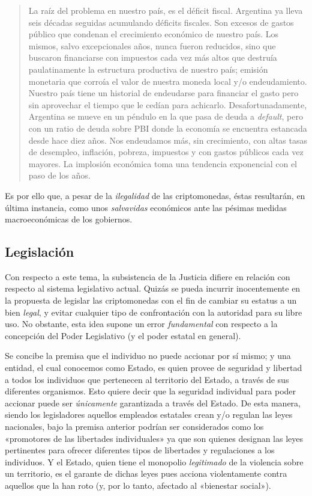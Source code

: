 \documentclass[12pt,a4paper,twoside]{book}
\begin{document}
\begin{quotation}
La raíz del problema en nuestro país, es el déficit fiscal. Argentina ya lleva seis décadas seguidas acumulando déficits fiscales. Son excesos de gastos público que condenan el crecimiento económico de nuestro país. Los mismos, salvo excepcionales años, nunca fueron reducidos, sino que buscaron financiarse con impuestos cada vez más altos que destruía paulatinamente la estructura productiva de nuestro país; emisión monetaria que corroía el valor de nuestra moneda local y/o endeudamiento. Nuestro país tiene un historial de endeudarse para financiar el gasto pero sin aprovechar el tiempo que le cedían para achicarlo. Desafortunadamente, Argentina se mueve en un péndulo en la que pasa de deuda a \textit{default}, pero con un ratio de deuda sobre PBI donde la economía se encuentra estancada desde hace diez años. Nos endeudamos más, sin crecimiento, con altas tasas de desempleo, inflación, pobreza, impuestos y con gastos públicos cada vez mayores. La implosión económica toma una tendencia exponencial con el paso de los años. \cite{motyl:deuda-argentina}
\end{quotation}		

Es por ello que, a pesar de la \textit{ilegalidad} de las criptomonedas, éstas resultarán, en última instancia, como unos \textit{salvavidas} económicos ante las pésimas medidas macroeconómicas de los gobiernos.

\subsection{Legislación}
Con respecto a este tema, la subsistencia de la Justicia difiere en relación con respecto al sistema legislativo actual. Quizás se pueda incurrir inocentemente en la propuesta de legislar las criptomonedas con el fin de cambiar su estatus a un bien \textit{legal}, y evitar cualquier tipo de confrontación con la autoridad para su libre uso. No obstante, esta idea supone un error \textit{fundamental} con respecto a la concepción del Poder Legislativo (y el poder estatal en general).

Se concibe la premisa que el individuo no puede accionar por sí mismo; y una entidad, el cual conocemos como Estado, es quien provee de seguridad y libertad a todos los individuos que pertenecen al territorio del Estado, a través de sus diferentes organismos. Esto quiere decir que la seguridad individual para poder accionar puede ser \textit{únicamente} garantizada a través del Estado. De esta manera, siendo los legisladores aquellos empleados estatales crean y/o regulan las leyes nacionales, bajo la premisa anterior podrían ser considerados como los «promotores de las libertades individuales» ya que son quienes designan las leyes pertinentes para ofrecer diferentes tipos de libertades y regulaciones a los individuos. Y el Estado, quien tiene el monopolio \textit{legitimado} de la violencia sobre un territorio, es el garante de dichas leyes pues acciona violentamente contra aquellos que la han roto (y, por lo tanto, afectado al «bienestar social»).
\end{document}
